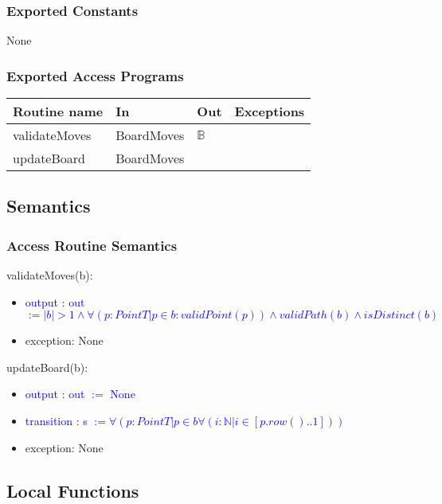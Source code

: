 \documentclass[12pt]{article}
\begin{document}
\subsubsection* {Exported Constants}

None

\subsubsection* {Exported Access Programs}

\begin{tabular}{| l | l | l | p{6cm} |}
\hline
\textbf{Routine name} & \textbf{In} & \textbf{Out} & \textbf{Exceptions}\\
\hline
validateMoves & BoardMoves & $\mathbb{B}$& \\
\hline
updateBoard & BoardMoves &  & \\
\hline
\end{tabular}

\subsection* {Semantics}

\subsubsection* {Access Routine Semantics}

\noindent validateMoves(b): 
\begin{itemize}
\item \textcolor{blue}{output : out $:= |b| > 1 \land \forall ( p : PointT | p \in b : validPoint(p)) \land validPath(b) \land isDistinct(b)$}
\item exception: None
\end{itemize}

\noindent updateBoard(b): 
\begin{itemize}
\item \textcolor{blue}{output : out $ := $ None}
\item \textcolor{blue}{transition : s $ := \forall (p : PointT | p \in b  \forall(i : \mathbb{N} | i \in [p.row()..1]) )$ }
\item exception: None
\end{itemize}

\subsection*{Local Functions}
\end{document}

